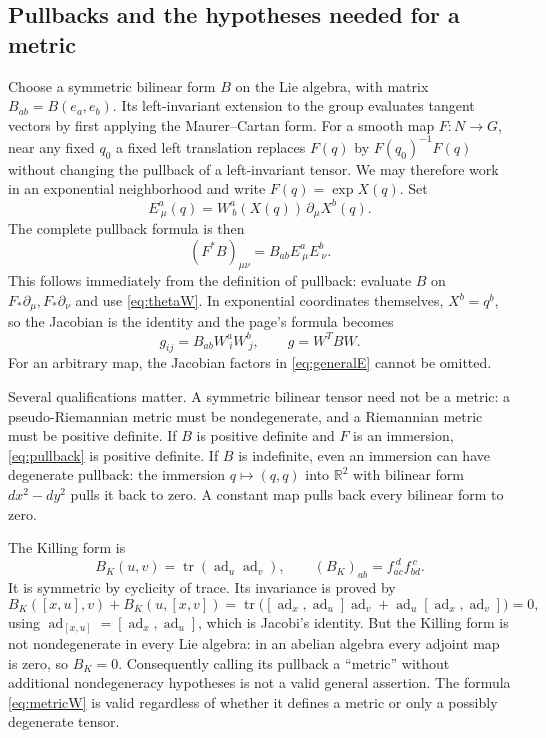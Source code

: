 \documentclass[11pt]{article}
\numberwithin{equation}{section}
\theoremstyle{definition}
\theoremstyle{remark}
\DeclareMathOperator{\ad}{ad}
\DeclareMathOperator{\tr}{tr}
\newcommand{\R}{\mathbb{R}}
\begin{document}
\subsection{Pullbacks and the hypotheses needed for a metric}
Choose a symmetric bilinear form $B$ on the Lie algebra, with
matrix $B_{ab}=B(e_a,e_b)$. Its left-invariant extension to the
group evaluates tangent vectors by first applying the
Maurer--Cartan form. For a smooth map $F:N\to G$, near any fixed $q_0$ a fixed
left translation replaces $F(q)$ by $F(q_0)^{-1}F(q)$ without
changing the pullback of a left-invariant tensor. We may therefore
work in an exponential neighborhood and write $F(q)=\exp X(q)$.
Set
\begin{equation}\label{eq:generalE}
 E^a_{\ \mu}(q)=W^a_{\ b}(X(q))\,\partial_\mu X^b(q).
\end{equation}
The complete pullback formula is then
\begin{equation}\label{eq:pullback}
 (F^*B)_{\mu\nu}=B_{ab}E^a_{\ \mu}E^b_{\ \nu}.
\end{equation}
This follows immediately from the definition of pullback: evaluate
$B$ on $F_*\partial_\mu,F_*\partial_\nu$ and use
\eqref{eq:thetaW}. In exponential coordinates themselves,
$X^b=q^b$, so the Jacobian is the identity and the page's formula
becomes
\begin{equation}\label{eq:metricW}
 g_{ij}=B_{ab}W^a_{\ i}W^b_{\ j},\qquad g=W^TBW.
\end{equation}
For an arbitrary map, the Jacobian factors in
\eqref{eq:generalE} cannot be omitted.

Several qualifications matter. A symmetric bilinear tensor need
not be a metric: a pseudo-Riemannian metric must be nondegenerate,
and a Riemannian metric must be positive definite. If $B$ is
positive definite and $F$ is an immersion, \eqref{eq:pullback} is
positive definite. If $B$ is indefinite, even an immersion can
have degenerate pullback: the immersion $q\mapsto(q,q)$ into
$\R^2$ with bilinear form $dx^2-dy^2$ pulls it back to zero. A
constant map pulls back every bilinear form to zero.

The Killing form is
\begin{equation}\label{eq:killing}
 B_K(u,v)=\tr(\ad_u\ad_v),\qquad
 (B_K)_{ab}=f_{ac}^{\ d}f_{bd}^{\ c}.
\end{equation}
It is symmetric by cyclicity of trace. Its invariance is proved by
\[
 B_K([x,u],v)+B_K(u,[x,v])
 =\tr\bigl([\ad_x,\ad_u]\ad_v+
             \ad_u[\ad_x,\ad_v]\bigr)=0,
\]
using $\ad_{[x,u]}=[\ad_x,\ad_u]$, which is Jacobi's identity.
But the Killing form is not nondegenerate in every Lie algebra:
in an abelian algebra every adjoint map is zero, so $B_K=0$.
Consequently calling its pullback a ``metric'' without additional
nondegeneracy hypotheses is not a valid general assertion.
The formula \eqref{eq:metricW} is valid regardless of whether it
defines a metric or only a possibly degenerate tensor.
\end{document}
